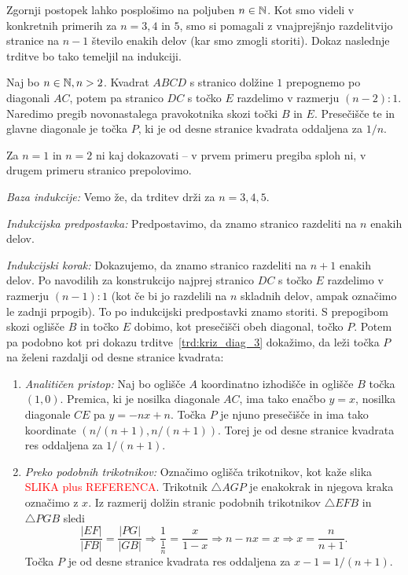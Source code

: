 Zgornji postopek lahko posplošimo na poljuben $n \in \mathbb N$. Kot smo videli v konkretnih primerih za $n = 3, 4$ in $5$, smo si pomagali z vnajprejšnjo razdelitvijo stranice na $n-1$ število enakih delov (kar smo zmogli storiti). Dokaz naslednje trditve bo tako temeljil na indukciji.

\begin{trditev}
    Naj bo $n \in \mathbb N, n > 2$. Kvadrat $ABCD$ s stranico dolžine $1$ prepognemo po diagonali $AC$, potem pa stranico $DC$ s točko $E$ razdelimo v razmerju $(n-2):1$. Naredimo pregib novonastalega pravokotnika skozi točki $B$ in $E$. Presečišče te in glavne diagonale je točka $P$, ki je od desne stranice kvadrata oddaljena za $1/n$.
\end{trditev}

\begin{dokaz}
    Za $n = 1$ in $n = 2$ ni kaj dokazovati -- v prvem primeru pregiba sploh ni, v drugem primeru stranico prepolovimo.

    \textit{Baza indukcije:} Vemo že, da trditev drži za $n = 3, 4, 5$.

    \textit{Indukcijska predpostavka:} Predpostavimo, da znamo stranico razdeliti na $n$ enakih delov.

    \textit{Indukcijski korak:} Dokazujemo, da znamo stranico razdeliti na $n+1$ enakih delov. Po navodilih za konstrukcijo najprej stranico $DC$ s točko $E$ razdelimo v razmerju $(n-1):1$ (kot če bi jo razdelili na $n$ skladnih delov, ampak označimo le zadnji prpogib). To po indukcijski predpostavki znamo storiti. S prepogibom skozi oglišče $B$ in točko $E$ dobimo, kot presečišči obeh diagonal, točko $P$. Potem pa podobno kot pri dokazu trditve~\ref{trd:kriz_diag_3} dokažimo, da leži točka $P$ na želeni razdalji od desne stranice kvadrata:
    \begin{enumerate}
        \item \textit{Analitičen pristop:} Naj bo oglišče $A$ koordinatno izhodišče in oglišče $B$ točka $(1, 0)$. Premica, ki je nosilka diagonale $AC$, ima tako enačbo $y = x$, nosilka diagonale $CE$ pa $y = -nx + n$. Točka $P$ je njuno presečišče in ima tako koordinate $(n/(n+1), n/(n+1))$. Torej je od desne stranice kvadrata res oddaljena za $1/(n+1)$.
        \item \textit{Preko podobnih trikotnikov:} Označimo oglišča trikotnikov, kot kaže slika \textcolor{red}{SLIKA plus REFERENCA}. Trikotnik $\triangle AGP$ je enakokrak in njegova kraka označimo z $x$. Iz razmerij dolžin stranic podobnih trikotnikov $\triangle EFB$ in $\triangle PGB$ sledi
        $$ \frac{|EF|}{|FB|} = \frac{|PG|}{|GB|} \Rightarrow \frac{1}{\frac{1}{n}} = \frac{x}{1 - x} \Rightarrow n - nx = x \Rightarrow x = \frac{n}{n+1}. $$
        Točka $P$ je od desne stranice kvadrata res oddaljena za $x - 1 = 1/(n + 1)$.
    \end{enumerate}

\end{dokaz}

